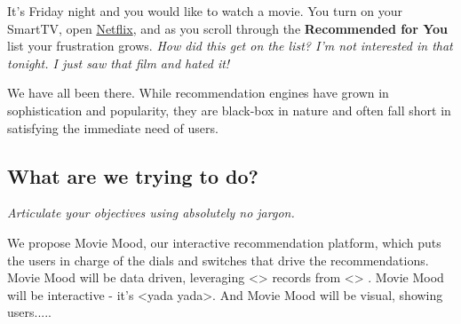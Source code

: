 It's Friday night and you would like to watch a movie.  You turn on your SmartTV, open \href{http://www.netflix.com}{Netflix}, and as you scroll through the \textbf{Recommended for You} list your frustration grows.   \textit{How did this get on the list?  I'm not interested in that tonight.  I just saw that film and hated it!}  

We have all been there.   While recommendation engines have grown in sophistication and popularity, they are black-box in nature and often fall short in satisfying the immediate need of users.   

\subsection{What are we trying to do?}
\textit{Articulate your objectives using absolutely no jargon.}

We propose Movie Mood, our interactive recommendation platform, which puts the users in charge of the dials and switches that drive the recommendations.   Movie Mood will be data driven, leveraging <> records from <> .   Movie Mood will be interactive - it's <yada yada>. And Movie Mood will be visual, showing users.....


